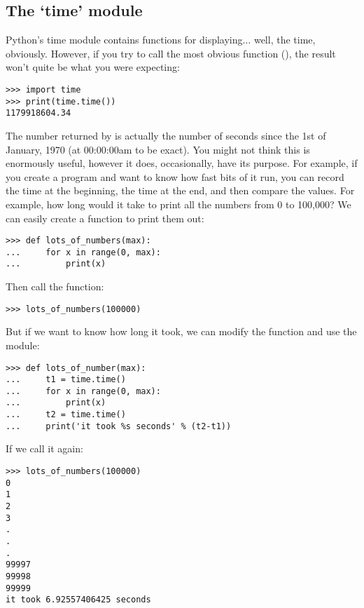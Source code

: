 \subsection*{The `time' module}

Python's time module contains functions for displaying$\ldots$ well, the time, obviously. However, if you try to call the most obvious function (), the result won't quite be what you were expecting:

\begin{Verbatim}[frame=single]
>>> import time
>>> print(time.time())
1179918604.34
\end{Verbatim}

The number returned by  is actually the number of seconds since the 1st of January, 1970 (at 00:00:00am to be exact). You might not think this is enormously useful, however it does, occasionally, have its purpose. For example, if you create a program and want to know how fast bits of it run, you can record the time at the beginning, the time at the end, and then compare the values. For example, how long would it take to print all the numbers from 0 to 100,000?  We can easily create a function to print them out:

\begin{Verbatim}[frame=single]
>>> def lots_of_numbers(max):
...     for x in range(0, max):
...         print(x)
\end{Verbatim}

\noindent
Then call the function:

\begin{Verbatim}[frame=single]
>>> lots_of_numbers(100000)
\end{Verbatim}

\noindent
But if we want to know how long it took, we can modify the function and use the  module:

\begin{Verbatim}[frame=single]
>>> def lots_of_number(max):
...     t1 = time.time()
...     for x in range(0, max):
...         print(x)
...     t2 = time.time()
...     print('it took %s seconds' % (t2-t1))
\end{Verbatim}

\noindent
If we call it again:

\begin{Verbatim}[frame=single]
>>> lots_of_numbers(100000)
0
1
2
3
.
.
.
99997
99998
99999
it took 6.92557406425 seconds
\end{Verbatim}

